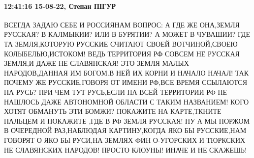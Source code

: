  
 
 
 
 

\paragraph{12:41:16 15-08-22, Степан ПІГУР}

ВСЕГДА ЗАДАЮ СЕБЕ И РОССИЯНАМ ВОПРОС: А ГДЕ ЖЕ ОНА,ЗЕМЛЯ
РУССКАЯ? В КАЛМЫКИИ? ИЛИ В БУРЯТИИ? А МОЖЕТ В ЧУВАШИИ? ГДЕ ТА ЗЕМЛЯ,КОТОРУЮ
РУССКИЕ СЧИТАЮТ СВОЕЙ ВОТЧИНОЙ,СВОЕЮ КОЛЫБЕЛЬЮ,ИСТОКОМ! ВЕДЬ ТЕРРИТОРИЯ РФ
СОВСЕМ НЕ РУССКАЯ ЗЕМЛЯ,И ДАЖЕ НЕ СЛАВЯНСКАЯ! ЭТО ЗЕМЛЯ МАЛЫХ НАРОДОВ,ДАННАЯ ИМ
БОГОМ.В НЕЙ ИХ КОРНИ И НАЧАЛО НАЧАЛ! ТАК ПОЧЕМУ ЖЕ РУССКИЕ,ГОВОРЯ ОТ ИМЕНИ
РФ,ВСЕ ВРЕМЯ ССЫЛАЮТСЯ НА РУСЬ? ПРИ ЧЕМ ТУТ РУСЬ,ЕСЛИ НА ВСЕЙ ТЕРРИТОРИИ РФ НЕ
НАШЛОСЬ ДАЖЕ АВТОНОМНОЙ ОБЛАСТИ С ТАКИМ НАЗВАНИЕМ! КОГО ХОТЯТ ОБМАНУТЬ ЭТИ
БОМЖИ? ПОКАЖИТЕ НА КАРТЕ,ТКНИТЕ ПАЛЬЦЕМ И ПОКАЖИТЕ ,ГДЕ В РФ ЗЕМЛЯ РУССКАЯ! НУ
А МЫ ПОРЖОМ В ОЧЕРЕДНОЙ РАЗ,НАБЛЮДАЯ КАРТИНУ,КОГДА ЯКО БЫ РУССКИЕ,НАМ ГОВОРЯТ О
ЯКО БЫ РУСИ,НА ЗЕМЛЯХ ФИН О-УГОРСКИХ И ТЮРКСКИХ НЕ СЛАВЯНСКИХ НАРОДОВ! ПРОСТО
КЛОУНЫ! ИНАЧЕ И НЕ СКАЖЕШЬ!

